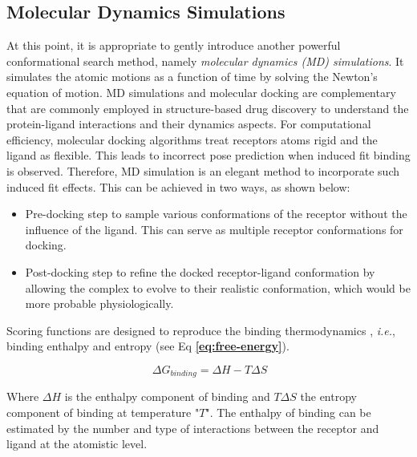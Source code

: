 \documentclass[10pt, a4paper]{book}
\begin{document}
\subsection*{Molecular Dynamics Simulations}
At this point, it is appropriate to gently introduce another powerful conformational search method, namely \textit{molecular dynamics (MD) simulations}. It simulates the atomic motions as a function of time by solving the Newton's equation of motion\cite{bib24}. 
MD simulations and molecular docking are complementary\cite{bib25, bib26} that are commonly employed in structure-based drug discovery to understand the protein-ligand interactions and their dynamics aspects. For computational efficiency, molecular docking algorithms treat receptors atoms rigid and the ligand as flexible. This leads to incorrect pose prediction when induced fit binding is observed. Therefore, MD simulation is an elegant method to incorporate such induced fit effects. This can be achieved in two ways, as shown below:
\begin{itemize}
\item Pre-docking step to sample various conformations of the receptor without the influence of the ligand.  This can serve as multiple receptor conformations for docking. 
\item Post-docking step to refine the docked receptor-ligand conformation by allowing the complex to evolve to their realistic conformation, which would be more probable physiologically.
\end{itemize}




Scoring functions are designed to reproduce the binding thermodynamics \cite{bib2, bib3}, \textit{i.e.}, binding enthalpy and entropy (see Eq \textbf{\ref{eq:free-energy}}).

\begin{equation} 
    \label{eq:free-energy}
    \   {\Delta}G_{binding} = {\Delta}H - T{\Delta}S   
\end{equation}

Where  \({\Delta}H\) is the enthalpy component of binding and \(T{\Delta}S\) the entropy component of binding at temperature "$T$".
The enthalpy of binding can be estimated by the number and type of interactions between the receptor and ligand at the atomistic level. {}
\end{document}
